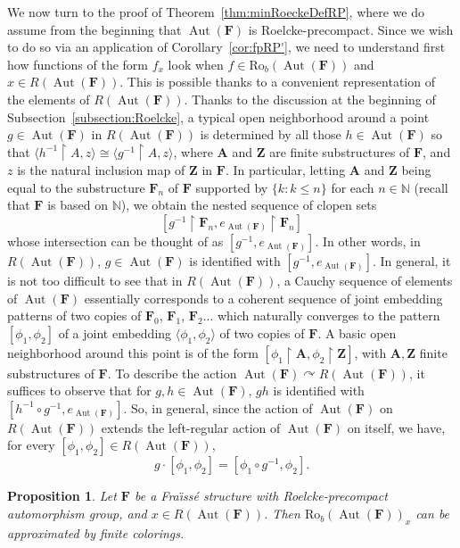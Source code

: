 \documentclass[11pt]{article}
\newtheorem{prop}[theo]{Proposition}
\theoremstyle{definition}
\numberwithin{equation}{section}
\numberwithin{figure}{section}
\numberwithin{table}{section}
\newcommand{\N}{\mathbb{N}}
\newcommand*{\mA}{\mathbf{A}}
\newcommand*{\mF}{\mathbf{F}}
\newcommand*{\mZ}{\mathbf{Z}}
\newcommand{\restrict}[2]{#1 \upharpoonright #2}
\DeclareMathOperator{\Aut}{Aut}
\newcommand{\actson}{\curvearrowright}
\newcommand{\ROB}{\mathrm{Ro}_{b}}
\begin{document}
We now turn to the proof of Theorem~\ref{thm:minRoeckeDefRP}, where we do assume from the beginning that $\Aut(\mF)$ is Roelcke-precompact. Since we wish to do so via an application of Corollary~\ref{cor:fpRP'}, we need to understand first how functions of the form $f_{x}$ look when $f\in \ROB(\Aut(\mF))$ and $x\in R(\Aut(\mF))$. This is possible thanks to a convenient representation of the elements of $R(\Aut(\mF))$. Thanks to the discussion at the beginning of Subsection~\ref{subsection:Roelcke}, a typical open neighborhood around a point $g\in \Aut(\mF)$ in $R(\Aut(\mF))$ is determined by all those $h\in \Aut(\mF)$ so that $\langle \restrict{h^{-1}}{A}, z \rangle \cong \langle \restrict{g^{-1}}{A}, z \rangle$, where $\mA$ and $\mZ$ are finite substructures of $\mF$, and $z$ is the natural inclusion map of $\mZ$ in $\mF$. In particular, letting $\mA$ and $\mZ$ being equal to the substructure $\mF_{n}$ of $\mF$ supported by $\{ k : k\leq n\}$ for each $n\in \N$ (recall that $\mF$ is based on $\N$), we obtain the nested sequence of clopen sets
\[
[\restrict{g^{-1}}{\mF_{n}}, \restrict{e_{\Aut(\mF)}}{\mF_{n}}]
\]
whose intersection can be thought of as $[g^{-1},e_{\Aut(\mF)}]$. In other words, in $R(\Aut(\mF))$, $g\in \Aut(\mF)$ is identified with $[g^{-1},e_{\Aut(\mF)}]$. In general, it is not too difficult to see that in $R(\Aut(\mF))$, a Cauchy sequence of elements of $\Aut(\mF)$ essentially corresponds to a coherent sequence of joint embedding patterns of two copies of $\mF_{0}$, $\mF_{1}$, $\mF_{2}\ldots$ which naturally converges to the pattern $[\phi_{1},\phi_{2}]$ of a joint embedding $\langle\phi_{1},\phi_{2}\rangle$ of two copies of $\mF$. A basic open neighborhood around this point is of the form $[\restrict{\phi_{1}}{\mA},\restrict{\phi_{2}}{\mZ}]$, with $\mA, \mZ$ finite substructures of $\mF$. To describe the action $\Aut(\mF)\actson R(\Aut(\mF))$, it suffices to observe that for $g, h\in \Aut(\mF)$, $gh$ is identified with $[h^{-1}\circ g^{-1},e_{\Aut(\mF)}]$. So, in general, since the action of $\Aut(\mF)$ on $R(\Aut(\mF))$ extends the left-regular action of $\Aut(\mF)$ on itself, we have, for every $[\phi_{1},\phi_{2}]\in R(\Aut(\mF))$,
\[
g\cdot[\phi_{1},\phi_{2}] = [\phi_{1}\circ g^{-1},\phi_{2}].
\]


\begin{prop}
Let $\mF$ be a Fra\"{\i}ss\'e structure with Roelcke-precompact automorphism group, and $x\in R(\Aut(\mF))$. Then $\ROB(\Aut(\mF))_{x}$ can be approximated by finite colorings.
\end{prop}
\end{document}
